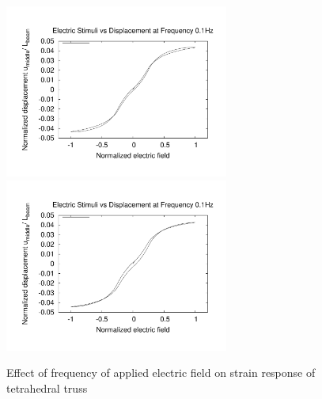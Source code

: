 \begin{figure}
{\includegraphics[width=2.9in]{./chap_5_active_trusses/truss_freq_study/truss_nonlinear_freq_5p0.pdf}}
{\includegraphics[width=2.9in]{./chap_5_active_trusses/truss_freq_study/truss_nonlinear_freq_10p0.pdf}}
\caption{Effect of frequency of applied electric field on strain response of tetrahedral truss}
\label{fig:truss_linear_Frequency_Effect}
\end{figure}